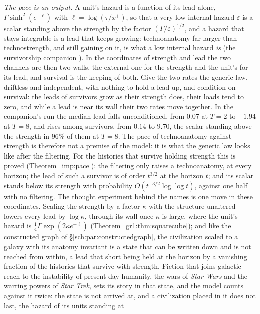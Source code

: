 \emph{The pace is an output.} A unit's hazard is a function of its lead
alone, $\Gamma\sinh^2(e^{-\ell})$ with $\ell=\log(\tau/x^+)$, so that a
very low internal hazard $\varepsilon$ is a scalar standing above the
strength by the factor $(\Gamma/\varepsilon)^{1/2}$, and a hazard that
stays integrable is a lead that keeps growing: technoanatomy far larger
than technostrength, and still gaining on it, is what a low internal
hazard \emph{is} (the survivorship companion \cite{GoldenSurvivorship}). In the coordinates of strength and lead
the two channels are then two walls, the external one for the strength
and the unit's for its lead, and survival is the keeping of both. Give
the two rates the generic law, driftless and independent, with nothing to
hold a lead up, and condition on survival: the leads of survivors grow as
their strength does, their loads tend to zero, and while a lead is near
its wall their two rates move together. In the companion's run the median lead
falls unconditioned, from $0.07$ at $T=2$ to $-1.94$ at $T=8$, and
rises among survivors, from $0.14$ to $9.70$, the scalar standing
above the strength in $96\%$ of them at $T=8$. The pace of
technoanatomy against strength is therefore not a premise of the model:
it is what the generic law looks like after the filtering. For the
histories that survive holding strength this is proved
(Theorem~\ref{imp:pace}): the filtering only raises a technoanatomy, at every
horizon; the lead of such a survivor is of order $t^{3/2}$ at the horizon
$t$; and its scalar stands below its strength with probability
$O(t^{-3/2}\log\log t)$, against one half with no filtering. The thought
experiment behind the names is one move in these coordinates. Scaling
the strength by a factor $\kappa$ with the structure unaltered lowers
every lead by $\log\kappa$, through its wall once $\kappa$ is large,
where the unit's hazard is $\tfrac14\Gamma\exp(2\kappa e^{-\ell})$
(Theorem~\ref{gr1:thm:squarecube}); and like the constructed graph of
\S\ref{sch:par:constructedgraph}, the civilization scaled to a galaxy
with its anatomy invariant is a state that can be written down and is
not reached from within, a lead that short being held at the horizon by
a vanishing fraction of the histories that survive with strength.
Fiction that joins galactic reach to the instability of present-day
humanity, the wars of \emph{Star Wars} and the warring powers of
\emph{Star Trek}, sets its story in that state, and the model counts
against it twice: the state is not arrived at, and a civilization placed
in it does not last, the hazard of its units standing at
